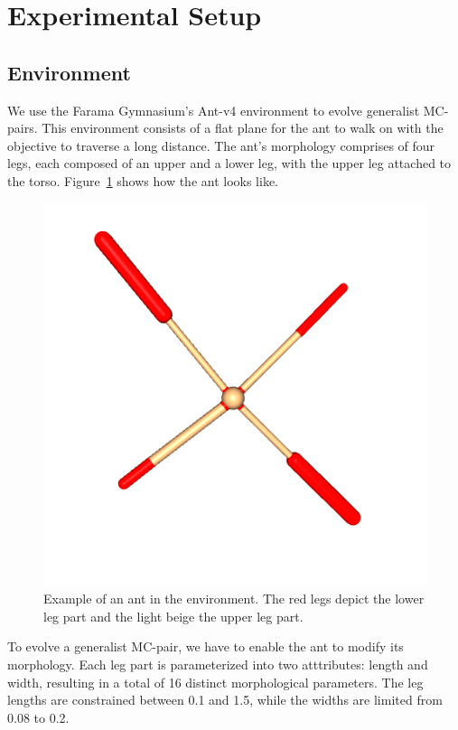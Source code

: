 \section{Experimental Setup}
    \subsection{Environment}
        We use the Farama Gymnasium's Ant-v4 environment \cite{Gymnasium2023} to evolve generalist MC-pairs. This environment consists of a flat plane for the ant to walk on with the objective to traverse a long distance. The ant's morphology comprises of four legs, each composed of an upper and a lower leg, with the upper leg attached to the torso. Figure~\ref{fig:ant_env} shows how the ant looks like. 
        \begin{figure}[ht]
            \centering
            \includegraphics[width=0.9\linewidth]{./resources/ant_307.png}
            \caption{Example of an ant in the environment. The red legs depict the lower leg part and the light beige the upper leg part.}
            \label{fig:ant_env}
        \end{figure}
        To evolve a generalist MC-pair, we have to enable the ant to modify its morphology. Each leg part is parameterized into two atttributes: length and width, resulting in a total of 16 distinct morphological parameters. The leg lengths are constrained between 0.1 and 1.5, while the widths are limited from 0.08 to 0.2. 
        

